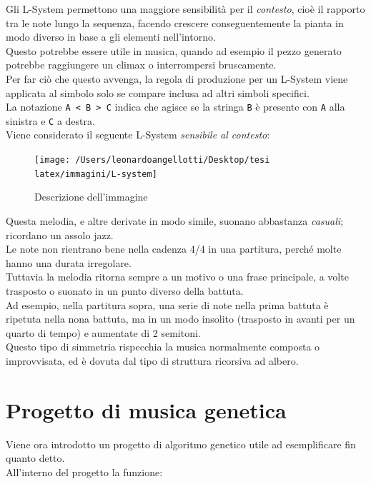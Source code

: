 \documentclass[a4paper,12pt]{report}
\begin{document}
Gli L-System permettono una maggiore sensibilità per il \textit{contesto}, cioè il rapporto tra le note lungo la sequenza, 
facendo crescere conseguentemente la pianta in modo diverso in base a gli elementi nell'intorno. \\
Questo potrebbe essere utile in musica, quando ad esempio il pezzo generato potrebbe raggiungere un climax o interrompersi bruscamente. \\
Per far ciò che questo avvenga, la regola di produzione per un L-System viene applicata al simbolo solo se compare inclusa ad altri simboli specifici. \\
La notazione \texttt{A < B > C} indica che agisce se la stringa \texttt{B} è presente con \texttt{A} alla sinistra e \texttt{C} a destra. \\
Viene considerato il seguente L-System \textit{sensibile al contesto}: 

\begin{figure}[H]
    \centering
    \texttt{[image: /Users/leonardoangellotti/Desktop/tesi latex/immagini/L-system]} 
    \caption{Descrizione dell'immagine}
    \label{fig:immagine}
\end{figure}

Questa melodia, e altre derivate in modo simile, suonano abbastanza \textit{casuali}; ricordano un assolo jazz. \\
Le note non rientrano bene nella cadenza 4/4 in una partitura, perché molte hanno una durata irregolare. \\
Tuttavia la melodia ritorna sempre a un motivo o una frase principale, a volte trasposto o suonato in un punto diverso della battuta. \\
Ad esempio, nella partitura sopra, una serie di note nella prima battuta è ripetuta nella nona battuta, ma in un modo insolito (trasposto in avanti per un quarto di tempo) e aumentate di 2 semitoni. \\
Questo tipo di simmetria rispecchia la musica normalmente composta o improvvisata, ed è dovuta dal tipo di struttura ricorsiva ad albero. 

\chapter{Progetto di musica genetica}

Viene ora introdotto un progetto di algoritmo genetico utile ad esemplificare fin quanto detto. \\
All'interno del progetto la funzione:
\end{document}
